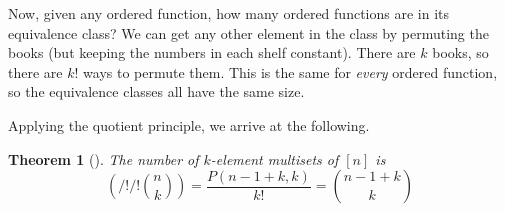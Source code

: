 \documentclass[10pt,]{book}
\theoremstyle{plain}
\newtheorem{theorem}{Theorem}[section]
\theoremstyle{definition}
\theoremstyle{definition}
\theoremstyle{definition}
\theoremstyle{definition}
\numberwithin{equation}{chapter}
\newcommand{\mchoose}[2]{\left(/!/!\binom{#1}{#2}\!\!\right)}
\begin{document}
\par
\hypertarget{p-756}{}%
Now, given any ordered function, how many ordered functions are in its equivalence class?  We can get any other element in the class by permuting the books (but keeping the numbers in each shelf constant).  There are \(k\) books, so there are \(k!\) ways to permute them.  This is the same for \emph{every} ordered function, so the equivalence classes all have the same size.%
\par
\hypertarget{p-757}{}%
Applying the quotient principle, we arrive at the following.%
\begin{theorem}[{}]\label{thm-multisetsize}
\hypertarget{p-758}{}%
The number of \(k\)-element multisets of \([n]\) is%
\begin{equation*}
\mchoose{n}{k} = \frac{P(n-1+k, k)}{k!} = \binom{n-1+k}{k} 
\end{equation*}
%
\end{theorem}
\typeout{************************************************}
\typeout{************************************************}
\end{document}
